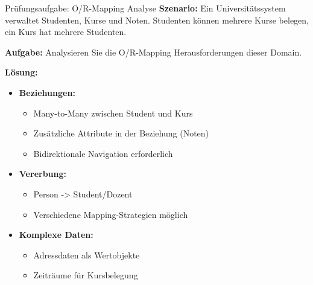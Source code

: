 \begin{example}{Prüfungsaufgabe: O/R-Mapping Analyse}
\textbf{Szenario:}
Ein Universitätssystem verwaltet Studenten, Kurse und Noten. Studenten können mehrere 
Kurse belegen, ein Kurs hat mehrere Studenten.

\textbf{Aufgabe:} 
Analysieren Sie die O/R-Mapping Herausforderungen dieser Domain.

\textbf{Lösung:}
\begin{itemize}
    \item \textbf{Beziehungen:}
    \begin{itemize}
        \item Many-to-Many zwischen Student und Kurs
        \item Zusätzliche Attribute in der Beziehung (Noten)
        \item Bidirektionale Navigation erforderlich
    \end{itemize}
    
    \item \textbf{Vererbung:}
    \begin{itemize}
        \item Person -> Student/Dozent
        \item Verschiedene Mapping-Strategien möglich
    \end{itemize}
    
    \item \textbf{Komplexe Daten:}
    \begin{itemize}
        \item Adressdaten als Wertobjekte
        \item Zeiträume für Kursbelegung
    \end{itemize}
\end{itemize}
\end{example}

